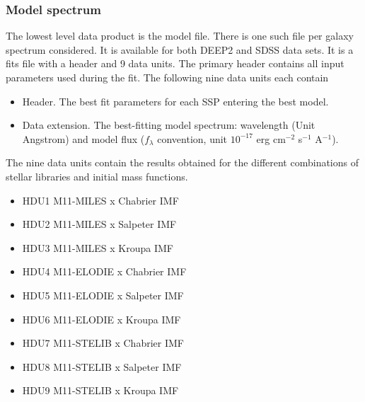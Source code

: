 \documentclass[onecolumn]{aa}
\begin{document}
\subsubsection{Model spectrum}
The lowest level data product is the model file. 
There is one such file per galaxy spectrum considered. 
It is available for both DEEP2 and SDSS data sets. 
It is a fits file with a header and 9 data units. 
The primary header contains all input parameters used during the fit.
The following nine data units each contain 
\begin{itemize}
\item Header. The best fit parameters for each SSP entering the best model. 
\item Data extension. The best-fitting model spectrum: wavelength (Unit Angstrom) and model flux ($f_\lambda$ convention, unit $10^{-17}$ erg cm$^{-2}$ s$^{-1}$ A$^{-1}$). 
\end{itemize} 

The nine data units contain the results obtained for the different combinations of stellar libraries and initial mass functions. 
\begin{itemize}
\item HDU1 M11-MILES x Chabrier IMF
\item HDU2 M11-MILES x Salpeter IMF
\item HDU3 M11-MILES x Kroupa IMF
\item HDU4 M11-ELODIE x Chabrier IMF
\item HDU5 M11-ELODIE x Salpeter IMF
\item HDU6 M11-ELODIE x Kroupa IMF
\item HDU7 M11-STELIB x Chabrier IMF
\item HDU8 M11-STELIB x Salpeter IMF
\item HDU9 M11-STELIB x Kroupa IMF
\end{itemize}
\end{document}
